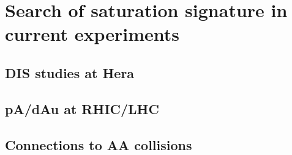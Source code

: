 \chapter{Search of saturation signature in current experiments}

\section{DIS studies at Hera}\label{sec:Hera}

\section{pA/dAu at RHIC/LHC}\label{sec:RHIC}

\section{Connections to AA collisions}\label{sec:AA}

